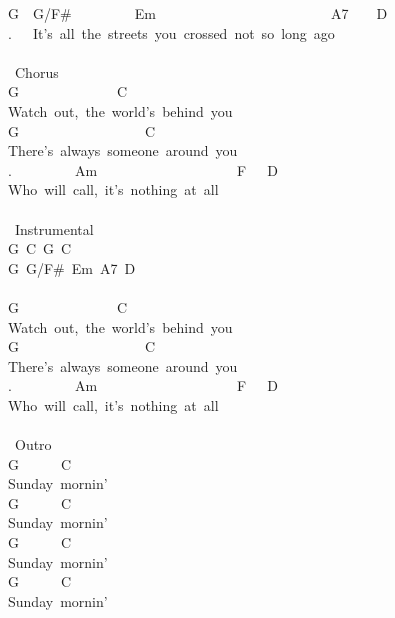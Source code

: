 {G\ \ G/F\#\ \ \ \ \ \ \ \ \ Em\ \ \ \ \ \ \ \ \ \ \ \ \ \ \ \ \ \ \ \ \ \ \ \ \ A7\ \ \ \ D\\
.\ \ \ It's\ all\ the\ streets\ you\ crossed\ not\ so\ long\ ago\\
\\
\lbrack\ Chorus\rbrack\\
G\ \ \ \ \ \ \ \ \ \ \ \ \ \ C\\
Watch\ out,\ the\ world's\ behind\ you\\
G\ \ \ \ \ \ \ \ \ \ \ \ \ \ \ \ \ \ C\\
There's\ always\ someone\ around\ you\\
.\ \ \ \ \ \ \ \ \ Am\ \ \ \ \ \ \ \ \ \ \ \ \ \ \ \ \ \ \ \ F\ \ \ D\\
Who\ will\ call,\ it's\ nothing\ at\ all\\
\\
\lbrack\ Instrumental\rbrack\\
G\ C\ G\ C\ \\
G\ G/F\#\ Em\ A7\ D\\
\\
G\ \ \ \ \ \ \ \ \ \ \ \ \ \ C\\
Watch\ out,\ the\ world's\ behind\ you\\
G\ \ \ \ \ \ \ \ \ \ \ \ \ \ \ \ \ \ C\\
There's\ always\ someone\ around\ you\\
.\ \ \ \ \ \ \ \ \ Am\ \ \ \ \ \ \ \ \ \ \ \ \ \ \ \ \ \ \ \ F\ \ \ D\\
Who\ will\ call,\ it's\ nothing\ at\ all\\
\\
\lbrack\ Outro\rbrack\\
G\ \ \ \ \ \ C\\
Sunday\ mornin'\\
G\ \ \ \ \ \ C\\
Sunday\ mornin'\\
G\ \ \ \ \ \ C\\
Sunday\ mornin'\\
G\ \ \ \ \ \ C\\
Sunday\ mornin'}
